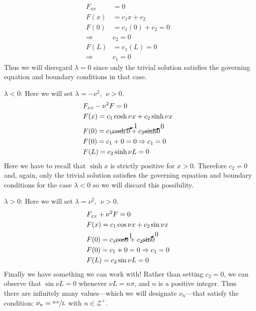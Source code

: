 \begin{align*}
F_{xx} &= 0 \\
F(x) &= c_1x + c_2 \\
F(0) &= c_1(0) + c_2 = 0 \\
\Rightarrow & c_2 = 0 \\
F(L) &= c_1(L) = 0 \\
\Rightarrow & c_1 = 0
\end{align*}
Thus we will disregard $\lambda = 0$ since only the trivial solution satisfies the governing equation and boundary conditions in that case.

\vspace{0.25cm}

\noindent\underline{$\lambda < 0$}:  Here we will set $\lambda = -\nu^2, \ \ \nu>0$. 
\begin{align*}
&F_{xx} - \nu^2 F = 0 \\
&F(x) = c_1 \cosh{\nu x} + c_2 \sinh{\nu x} \\
&F(0) = c_1 \cancelto{1}{\cosh{0}} + c_2 \cancelto{0}\sinh{0} \\
&F(0) = c_1 + 0 = 0 \Rightarrow c_1 = 0 \\
&F(L) = c_2 \sinh{\nu L} = 0 \\
\end{align*}
Here we have to recall that $\sinh{x}$ is strictly positive for $x>0$.  Therefore $c_2 = 0$ and, again, only the trivial solution satisfies the governing equation and boundary conditions for the case $\lambda < 0$ so we will discard this possibility.

\vspace{0.25cm}

\noindent\underline{$\lambda > 0$}:  Here we will set $\lambda = \nu^2, \ \ \nu>0$.
\begin{align*}
&F_{xx} + \nu^2 F = 0 \\
&F(x) = c_1 \cos{\nu x} + c_2 \sin{\nu x} \\
&F(0) = c_1 \cancelto{1}\cos{0} + c_2 \cancelto{0}\sin{0} \\
&F(0) = c_1 + 0 = 0 \Rightarrow c_1 = 0 \\
&F(L) = c_2 \sin{\nu L} = 0
\end{align*}
Finally we have something we can work with!  Rather than setting $c_2 = 0$, we can observe that $\sin{\nu L} = 0$ whenever $\nu L = n \pi$, and $n$ is a positive integer.  Thus there are infinitely many values---which we will designate $\nu_n$---that satisfy the condition: $\nu_n = \sfrac{n \pi}{L}$ with $n\in \mathcal{Z}^{+}$.

